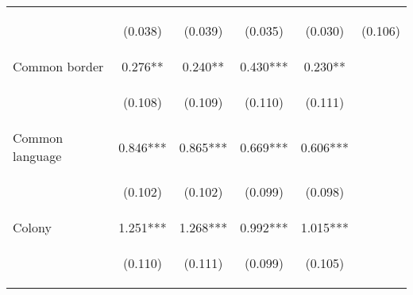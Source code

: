 \begin{center}
\begin{tabular}{lccccc}
\vspace{4pt} & \begin{footnotesize}(0.038)\end{footnotesize} & \begin{footnotesize}(0.039)\end{footnotesize} & \begin{footnotesize}(0.035)\end{footnotesize} & \begin{footnotesize}(0.030)\end{footnotesize} & \begin{footnotesize}(0.106)\end{footnotesize} \\
Common border & 0.276** & 0.240** & 0.430*** & 0.230** &  \\
\vspace{4pt} & \begin{footnotesize}(0.108)\end{footnotesize} & \begin{footnotesize}(0.109)\end{footnotesize} & \begin{footnotesize}(0.110)\end{footnotesize} & \begin{footnotesize}(0.111)\end{footnotesize} & \begin{footnotesize}\end{footnotesize} \\
Common language & 0.846*** & 0.865*** & 0.669*** & 0.606*** &  \\
\vspace{4pt} & \begin{footnotesize}(0.102)\end{footnotesize} & \begin{footnotesize}(0.102)\end{footnotesize} & \begin{footnotesize}(0.099)\end{footnotesize} & \begin{footnotesize}(0.098)\end{footnotesize} & \begin{footnotesize}\end{footnotesize} \\
Colony & 1.251*** & 1.268*** & 0.992*** & 1.015*** &  \\
\vspace{4pt} & \begin{footnotesize}(0.110)\end{footnotesize} & \begin{footnotesize}(0.111)\end{footnotesize} & \begin{footnotesize}(0.099)\end{footnotesize} & \begin{footnotesize}(0.105)\end{footnotesize} & \begin{footnotesize}\end{footnotesize} \\

\end{tabular}
\end{center}
